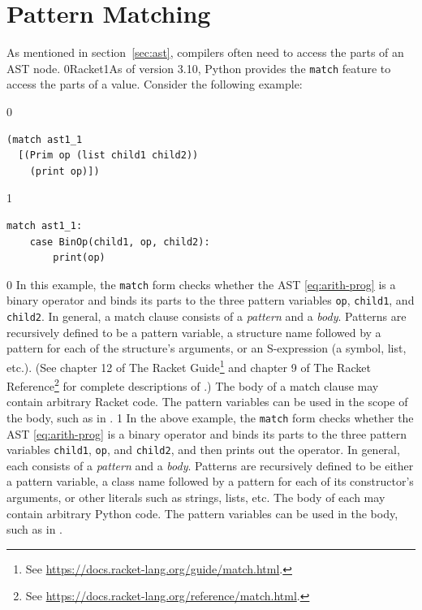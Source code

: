 \documentclass[7x10]{TimesAPriori_MIT}%
\def\racketEd{0}
\def\pythonEd{1}
\def\edition{1}
\newcommand{\racket}[1]{{\if\edition\racketEd{#1}\fi}}
\newcommand{\pythonColor}[0]{}
\newcommand{\python}[1]{{\if\edition\pythonEd\pythonColor #1\fi}}
\numberwithin{theorem}{chapter}
\numberwithin{definition}{chapter}
\numberwithin{equation}{chapter}
\begin{document}
\section{Pattern Matching}
\label{sec:pattern-matching}

As mentioned in section~\ref{sec:ast}, compilers often need to access
the parts of an AST node. \racket{Racket}\python{As of version 3.10, Python}
provides the \texttt{match} feature to access the parts of a value.
Consider the following example:  
\begin{center}
\begin{minipage}{0.5\textwidth}
{\if\edition\racketEd
\begin{lstlisting}
(match ast1_1
  [(Prim op (list child1 child2))
    (print op)])
\end{lstlisting}
\fi}
{\if\edition\pythonEd\pythonColor
\begin{lstlisting}
match ast1_1:
    case BinOp(child1, op, child2):
        print(op)
\end{lstlisting}
\fi}  
\end{minipage}
\end{center}

{\if\edition\racketEd
%
In this example, the \texttt{match} form checks whether the AST
\eqref{eq:arith-prog} is a binary operator and binds its parts to the
three pattern variables \texttt{op}, \texttt{child1}, and
\texttt{child2}. In general, a match clause consists of a
\emph{pattern} and a \emph{body}. Patterns are
recursively defined to be a pattern variable, a structure name
followed by a pattern for each of the structure's arguments, or an
S-expression (a symbol, list, etc.).  (See chapter 12 of The Racket
Guide\footnote{See \url{https://docs.racket-lang.org/guide/match.html}.}
and chapter 9 of The Racket
Reference\footnote{See \url{https://docs.racket-lang.org/reference/match.html}.}
for complete descriptions of .)
%
The body of a match clause may contain arbitrary Racket code.  The
pattern variables can be used in the scope of the body, such as
 in .
%
\fi}
%
%
{\if\edition\pythonEd\pythonColor
%  
In the above example, the \texttt{match} form checks whether the AST
\eqref{eq:arith-prog} is a binary operator and binds its parts to the
three pattern variables \texttt{child1}, \texttt{op}, and
\texttt{child2}, and then prints out the operator. In general, each
 consists of a \emph{pattern} and a
\emph{body}. Patterns are recursively defined
to be either a pattern variable, a class name followed by a pattern
for each of its constructor's arguments, or other
literals such as strings, lists, etc.
%
The body of each  may contain arbitrary Python code. The
pattern variables can be used in the body, such as  in
.
%
\fi}
\end{document}
